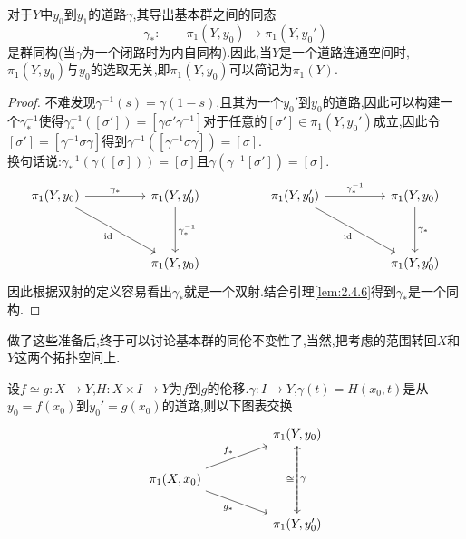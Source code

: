 \documentclass{article}
\begin{document}
    \begin{theorem}
        对于$Y$中$y_0$到$y_1$的道路$\gamma$,其导出基本群之间的同态
        $$
        \gamma_* :\qquad \pi_1(Y,y_0) \to \pi_1(Y,y_0')
        $$
        是群同构(当$\gamma$为一个闭路时为内自同构).因此,当$Y$是一个道路连通空间时,$\pi_1(Y,y_0)$与$y_0$的选取无关,即$\pi_1(Y,y_0)$可以简记为$\pi_1(Y)$.
    \end{theorem}
    \begin{proof}
        不难发现$\gamma^{-1}(s) = \gamma(1-s)$,且其为一个$y_0'$到$y_0$的道路,因此可以构建一个$\gamma^{-1}_*$使得$\gamma^{-1}_*([\sigma']) = [\gamma \sigma' \gamma^{-1}]$对于任意的$[\sigma']\in \pi_1(Y,y_0')$成立,因此令$[\sigma'] = [\gamma^{-1}\sigma \gamma]$得到$\gamma^{-1}([\gamma^{-1}\sigma \gamma]) = [\sigma]$.\\
        换句话说:$\gamma^{-1}_*(\gamma([\sigma])) = [\sigma]$且$\gamma(\gamma^{-1}[\sigma']) = [\sigma]$.\\
        \[\begin{tikzcd}
            {\pi_1(Y,y_0)} && {\pi_1(Y,y_0')} && {\pi_1(Y,y_0')} && {\pi_1(Y,y_0)} \\
            \\
            && {\pi_1(Y,y_0)} &&&& {\pi_1(Y,y_0')}
            \arrow["{\gamma^{-1}_*}", from=1-5, to=1-7]
            \arrow["{\gamma_*}", from=1-7, to=3-7]
            \arrow["{\text{id}}"', from=1-5, to=3-7]
            \arrow["{\gamma_*}", from=1-1, to=1-3]
            \arrow["{\text{id}}"', from=1-1, to=3-3]
            \arrow["{\gamma^{-1}_*}", from=1-3, to=3-3]
        \end{tikzcd}\]
        因此根据双射的定义容易看出$\gamma_*$就是一个双射.结合引理\ref{lem:2.4.6}得到$\gamma_*$是一个同构.
    \end{proof}
    做了这些准备后,终于可以讨论基本群的同伦不变性了,当然,把考虑的范围转回$X$和$Y$这两个拓扑空间上.
    \begin{theorem}
        设$f \simeq g : X \to Y$,$H : X \times I \to Y$为$f$到$g$的伦移.$\gamma : I \to Y$,$\gamma(t) = H(x_0,t)$是从$y_0 = f(x_0)$到$y_0' = g(x_0)$的道路,则以下图表交换
        \[\begin{tikzcd}
            && {\pi_1(Y,y_0)} \\
            {\pi_1(X,x_0)} \\
            && {\pi_1(Y,y_0')}
            \arrow["{f_*}", from=2-1, to=1-3]
            \arrow["{g_*}"', from=2-1, to=3-3]
            \arrow["\gamma", dashed, from=1-3, to=3-3]
            \arrow["\cong", from=3-3, to=1-3]
        \end{tikzcd}\]
        \label{the:2.4.8}
    \end{theorem}
\end{document}
